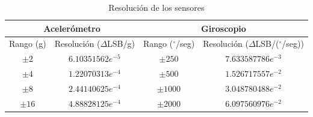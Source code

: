 \documentclass[12pt,a4paper]{article}
\newcommand{\grad}{$^{\circ}$}
\begin{document}
\begin{itemize}
		\begin{table}[H]
			\centering
			\label{table:resolucionSensor}
			\begin{tabular}{|c|c|c|c|}
				\hline
				\multicolumn{2}{|c|}{Acelerómetro} &\multicolumn{2}{|c|}{Giroscopio}   \\
				\hline
				Rango (g)        & Resolución ($\Delta$LSB/g)  & Rango (\grad/seg)     &  Resolución ($\Delta$LSB/(\grad/seg))\\ \hline
				$\pm 2$     &  $6.10351562e^{-5}$   &$\pm 250 $ 	& 	$7.633587786e^{-3}$ 	\\ 
				$\pm 4$     &  $1.22070313e^{-4}$  	&$\pm 500 $ 	& 	$1.526717557e^{-2}$    	\\
				$\pm 8$     &  $2.44140625e^{-4}$ 	& $\pm 1000$  	& 	$3.048780488e^{-2}$		\\
				$\pm 16$    &  $4.88828125e^{-4}$   & $\pm 2000$    & 	$6.097560976e^{-2}$     \\ 
				\hline
			\end{tabular}
			\caption{Resolución de los sensores}
		\end{table}
	
\end{itemize}
\end{document}
